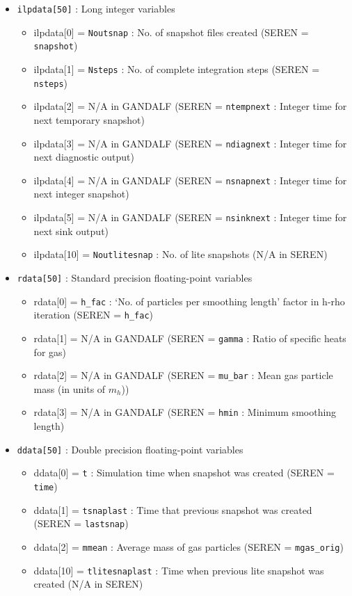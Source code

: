 \documentclass[a4paper]{article}
\newcommand{\var}[1]{\texttt{#1}}
\begin{document}
\begin{itemize}
\item \var{ilpdata[50]} : Long integer variables
\begin{itemize}
\item ilpdata[0] = \var{Noutsnap} : No. of snapshot files created (SEREN = \var{snapshot})
\item ilpdata[1] = \var{Nsteps} : No. of complete integration steps (SEREN = \var{nsteps})
\item ilpdata[2] = N/A in GANDALF (SEREN = \var{ntempnext} : Integer time for next temporary snapshot)
\item ilpdata[3] = N/A in GANDALF (SEREN = \var{ndiagnext} : Integer time for next diagnostic output)
\item ilpdata[4] = N/A in GANDALF (SEREN = \var{nsnapnext} : Integer time for next integer snapshot)
\item ilpdata[5] = N/A in GANDALF (SEREN = \var{nsinknext} : Integer time for next sink output)
\item ilpdata[10] = \var{Noutlitesnap} : No. of lite snapshots (N/A in SEREN)
\end{itemize}
\item \var{rdata[50]} : Standard precision floating-point variables
\begin{itemize}
\item rdata[0] = \var{h\_fac} : `No. of particles per smoothing length' factor in h-rho iteration (SEREN = \var{h\_fac})
\item rdata[1] = N/A in GANDALF (SEREN = \var{gamma} : Ratio of specific heats for gas)
\item rdata[2] = N/A in GANDALF (SEREN = \var{mu\_bar} : Mean gas particle mass (in units of $m_h$))
\item rdata[3] = N/A in GANDALF (SEREN = \var{hmin} : Minimum smoothing length)
\end{itemize}
\item \var{ddata[50]} : Double precision floating-point variables
\begin{itemize}
\item ddata[0] = \var{t} : Simulation time when snapshot was created (SEREN = \var{time})
\item ddata[1] = \var{tsnaplast} : Time that previous snapshot was created (SEREN = \var{lastsnap})
\item ddata[2] = \var{mmean} : Average mass of gas particles (SEREN = \var{mgas\_orig})
\item ddata[10] = \var{tlitesnaplast} : Time when previous lite snapshot was created (N/A in SEREN)

\end{itemize}
\end{itemize}
\end{document}
